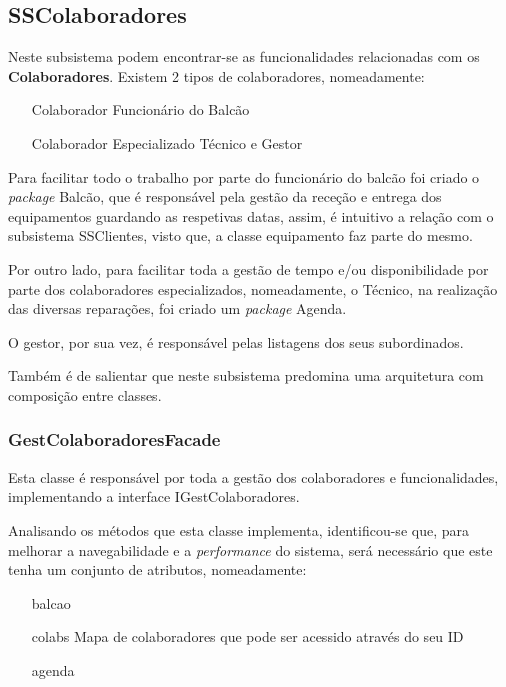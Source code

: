 \documentclass[a4paper,12pt]{scrreprt}
\begin{document}
\subsection{SSColaboradores}
Neste subsistema podem encontrar-se as funcionalidades relacionadas com os \textbf{Colaboradores}.
Existem 2 tipos de colaboradores, nomeadamente:
\begin{itemize}
    \item [Colaborador]{Funcionário do Balcão}
    \item [Colaborador Especializado] {Técnico e Gestor}
\end{itemize}

Para facilitar todo o trabalho por parte do funcionário do balcão foi criado o \textit{package} Balcão, que é responsável pela gestão da
receção e entrega dos equipamentos guardando as respetivas datas, assim, é intuitivo a relação com o subsistema SSClientes, visto que,
a classe equipamento faz parte do mesmo.

Por outro lado, para facilitar toda a gestão de tempo e/ou disponibilidade por parte dos colaboradores especializados, nomeadamente, o Técnico, na realização das 
diversas reparações, foi criado um \textit{package} Agenda. 

O gestor, por sua vez, é responsável pelas listagens dos seus subordinados.

Também é de salientar que neste subsistema predomina uma arquitetura com composição entre classes.

\subsubsection{GestColaboradoresFacade}
Esta classe é responsável por toda a gestão dos colaboradores e funcionalidades, implementando a interface IGestColaboradores.

Analisando os métodos que esta classe implementa, identificou-se que, para melhorar a navegabilidade
e a \textit{performance} do sistema, será necessário que este tenha um conjunto de atributos, nomeadamente:
\begin{itemize}
    \item [balcao]
    \item [colabs]{Mapa de colaboradores que pode ser acessido através do seu ID}
    \item [agenda]
\end{itemize}
\end{document}
